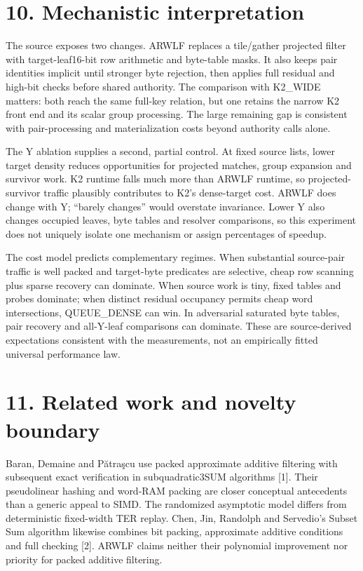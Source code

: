 \documentclass[10pt,letterpaper]{article}
\begin{document}
\section*{10. Mechanistic interpretation}

The source exposes two changes. ARWLF replaces a tile/gather projected filter with target-leaf16-bit row arithmetic and byte-table masks. It also keeps pair identities implicit until stronger byte rejection, then applies full residual and high-bit checks before shared authority. The comparison with K2\_WIDE matters: both reach the same full-key relation, but one retains the narrow K2 front end and its scalar group processing. The large remaining gap is consistent with pair-processing and materialization costs beyond authority calls alone.


The Y ablation supplies a second, partial control. At fixed source lists, lower target density reduces opportunities for projected matches, group expansion and survivor work. K2 runtime falls much more than ARWLF runtime, so projected-survivor traffic plausibly contributes to K2's dense-target cost. ARWLF does change with Y; ``barely changes'' would overstate invariance. Lower Y also changes occupied leaves, byte tables and resolver comparisons, so this experiment does not uniquely isolate one mechanism or assign percentages of speedup.


The cost model predicts complementary regimes. When substantial source-pair traffic is well packed and target-byte predicates are selective, cheap row scanning plus sparse recovery can dominate. When source work is tiny, fixed tables and probes dominate; when distinct residual occupancy permits cheap word intersections, QUEUE\_DENSE can win. In adversarial saturated byte tables, pair recovery and all-Y-leaf comparisons can dominate. These are source-derived expectations consistent with the measurements, not an empirically fitted universal performance law.


\section*{11. Related work and novelty boundary}

Baran, Demaine and Pătraşcu use packed approximate additive filtering with subsequent exact verification in subquadratic3SUM algorithms [1]. Their pseudolinear hashing and word-RAM packing are closer conceptual antecedents than a generic appeal to SIMD. The randomized asymptotic model differs from deterministic fixed-width TER replay. Chen, Jin, Randolph and Servedio's Subset Sum algorithm likewise combines bit packing, approximate additive conditions and full checking [2]. ARWLF claims neither their polynomial improvement nor priority for packed additive filtering.
\end{document}

